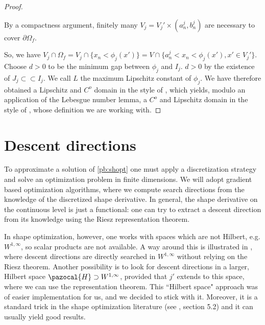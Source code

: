 \documentclass[english,a4paper,10pt,oneside]{scrbook}	%
\theoremstyle{break}
\newenvironment{mproof}[1][\proofname]{%
  \begin{proof}[#1]$ $\par\nobreak\ignorespaces
}{%
  \end{proof}
}
\renewcommand*{\proofname}{Proof}
\theoremstyle{remark}
\newcommand{\cc}{\subset\subset}
\begin{document}
\begin{mproof}

 By a compactness argument, finitely many $V_j = V_j'\times (a_n^j, b_n^j) $ are necessary to cover $\partial \Omega_f$. 

So, we have $V_j \cap \Omega_f = V_j\cap \{x_n<\phi_j(x')\} = V\cap \{a_n^j<x_n<\phi_j(x'), x' \in V_j'\}$. Choose $d>0$ to be the minimum gap between $\phi_j$ and $I_j$. $d>0$ by the existence of $J_j \cc I_j$. We call $L$ the maximum Lipschitz constant of $\phi_j$. 
We have therefore obtained a Lipschitz and $C^o$ domain in the style of \cite{burenkov}, which yields, modulo an application of the Lebesgue number lemma, a $C^o$ and Lipschitz domain in the style of \cite{grisvard}, whose definition we are working with.
\end{mproof}

\section{Descent directions}
\label{sec:hilbert}

To approximate a solution of \cref{pb:shopt} one must apply a discretization strategy and solve an optimization problem in finite dimensions. We will adopt gradient based optimization algorithms, where we compute search directions from the knowledge of the discretized shape derivative. In general, the shape derivative on the continuous level is just a functional: one can try to extract a descent direction from its knowledge using the Riesz representation theorem.


In shape optimization, however, one works with spaces which are not Hilbert, e.g. $W^{1,\infty}$, so scalar products are not available. A way around this is illustrated in \cite{deckelnick}, where descent directions are directly searched in $W^{1,\infty}$ without relying on the Riesz theorem. Another possibility is to look for descent directions in a larger, Hilbert space $\pazocal{H}\supset W^{1,\infty}$, provided that $j'$ extends to this space, where we can use the representation theorem. This ``Hilbert space" approach was of easier implementation for us, and we decided to stick with it.  Moreover, it is a standard trick in the shape optimization literature (see \cite{allaire}, section 5.2) and it can usually yield good results.
\end{document}
